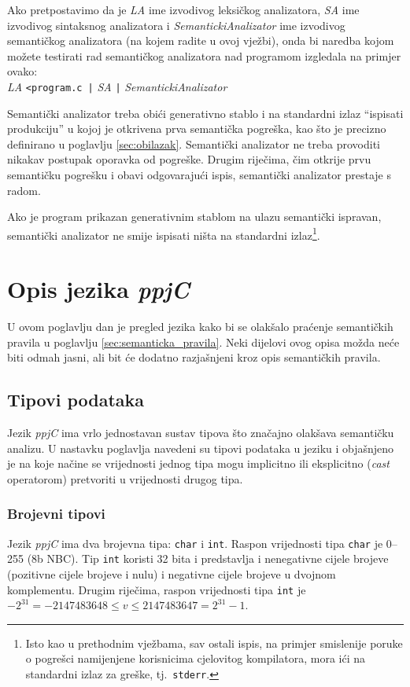 \documentclass[times, 12pt, utf8]{book}
\begin{document}
Ako pretpostavimo da je \emph{LA} ime izvodivog leksičkog analizatora, \emph{SA} ime izvodivog sintaksnog analizatora i \emph{SemantickiAnalizator} ime izvodivog semantičkog analizatora (na kojem radite u ovoj vježbi), onda bi naredba kojom možete testirati rad semantičkog analizatora nad programom izgledala na primjer ovako:\\
\emph{LA} \verb#<program.c |# \emph{SA} \verb#|# \emph{SemantickiAnalizator}

Semantički analizator treba obići generativno stablo i na standardni izlaz ``ispisati produkciju'' u kojoj je otkrivena prva semantička pogreška, kao što je precizno definirano u poglavlju \ref{sec:obilazak}.
Semantički analizator ne treba provoditi nikakav postupak oporavka od pogreške.
Drugim riječima, čim otkrije prvu semantičku pogrešku i obavi odgovarajući ispis, semantički analizator prestaje s radom.

Ako je program prikazan generativnim stablom na ulazu semantički ispravan, semantički analizator ne smije ispisati ništa na standardni izlaz\footnote{Isto kao u prethodnim vježbama, sav ostali ispis, na primjer smislenije poruke o pogrešci namijenjene korisnicima cjelovitog kompilatora, mora ići na standardni izlaz za greške, tj.~\texttt{stderr}.}.


\section{Opis jezika \emph{ppjC}}
U ovom poglavlju dan je pregled jezika kako bi se olakšalo praćenje semantičkih pravila u poglavlju \ref{sec:semanticka_pravila}.
Neki dijelovi ovog opisa možda neće biti odmah jasni, ali bit će dodatno razjašnjeni kroz opis semantičkih pravila.

\subsection{Tipovi podataka}
Jezik \emph{ppjC} ima vrlo jednostavan sustav tipova što značajno olakšava semantičku analizu.
U nastavku poglavlja navedeni su tipovi podataka u jeziku i objašnjeno je na koje načine se vrijednosti jednog tipa mogu implicitno ili eksplicitno (\emph{cast} operatorom) pretvoriti u vrijednosti drugog tipa.

\subsubsection{Brojevni tipovi}
Jezik \emph{ppjC} ima dva brojevna tipa: \verb|char| i \verb|int|.
Raspon vrijednosti tipa \verb|char| je 0--255 (8b NBC).
Tip \verb|int| koristi 32 bita i predstavlja i nenegativne cijele brojeve (pozitivne cijele brojeve i nulu) i negativne cijele brojeve u dvojnom komplementu.
Drugim riječima, raspon vrijednosti tipa \verb|int| je \(-2^{31} = -2147483648 \le v \le 2147483647 = 2^{31} - 1\).
\end{document}
